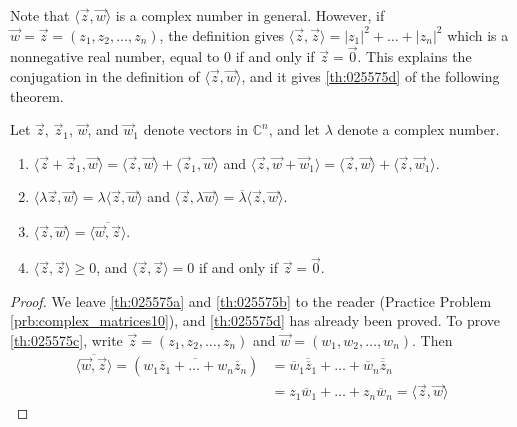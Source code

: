 \documentclass{ximera}
\begin{document}
Note that $\langle \vec{z}, \vec{w} \rangle$ is a complex number in general. However, if $\vec{w} = \vec{z} = (z_{1}, z_{2}, \ldots, z_{n})$, the definition gives $\langle \vec{z}, \vec{z} \rangle = |z_{1}|^{2} + \ldots  + |z_{n}|^{2}$ which is a nonnegative real number, equal to $0$ if and only if $\vec{z} = \vec{0}$. This explains the conjugation in the definition of $\langle \vec{z}, \vec{w} \rangle$, and it gives \ref{th:025575d} of the following theorem.


\begin{theorem}\label{th:025575}
Let $\vec{z}$, $\vec{z}_{1}$, $\vec{w}$, and $\vec{w}_{1}$ denote vectors in $\mathbb{C}^n$, and let $\lambda$ denote a complex number.
\begin{enumerate}
\item\label{th:025575a} $\langle \vec{z} + \vec{z}_{1}, \vec{w}\rangle = \langle \vec{z}, \vec{w} \rangle + \langle \vec{z}_{1}, \vec{w} \rangle$ \quad and \quad
$\langle \vec{z}, \vec{w} + \vec{w}_{1} \rangle = \langle \vec{z}, \vec{w} \rangle + \langle \vec{z}, \vec{w}_{1} \rangle$.

\item\label{th:025575b} $\langle \lambda \vec{z}, \vec{w} \rangle = \lambda \langle \vec{z}, \vec{w} \rangle$ \quad and \quad $\langle \vec{z}, \lambda \vec{w} \rangle = \overline{\lambda} \langle \vec{z}, \vec{w} \rangle$.

\item\label{th:025575c} $\langle \vec{z}, \vec{w} \rangle = \overline{\langle \vec{w}, \vec{z} \rangle}$.

\item\label{th:025575d} $\langle \vec{z}, \vec{z} \rangle \ge 0$, \quad and \quad $\langle \vec{z}, \vec{z} \rangle = 0$ if and only if $\vec{z} = \vec{0}$.

\end{enumerate}
\end{theorem}

\begin{proof}
We leave \ref{th:025575a} and \ref{th:025575b} to the reader (Practice Problem \ref{prb:complex_matrices10}), and \ref{th:025575d} has already been proved. To prove \ref{th:025575c}, write $\vec{z} = (z_{1}, z_{2}, \ldots, z_{n})$ and $\vec{w} = (w_{1}, w_{2}, \ldots, w_{n})$. Then
\begin{align*}
\overline{\langle \vec{w}, \vec{z} \rangle} = (\overline{w_{1}\overline{z}_{1} + \ldots + w_{n}\overline{z}_{n}}) &= \overline{w}_{1}\overline{\overline{z}}_{1} + \ldots + \overline{w}_{n}\overline{\overline{z}}_{n} \\
&= z_{1}\overline{w}_{1} + \ldots + z_{n}\overline{w}_{n} = \langle \vec{z}, \vec{w} \rangle
\end{align*}
\end{proof}
\end{document}

